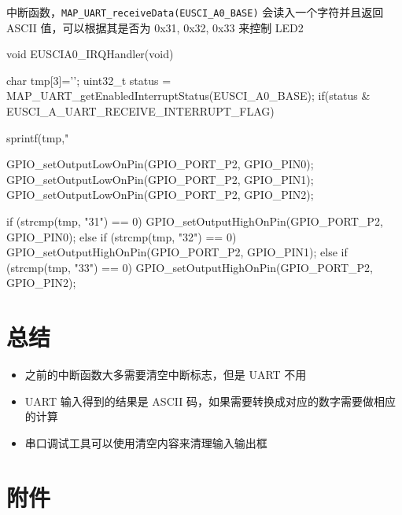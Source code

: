 \documentclass[a4paper,10pt,UTF8]{paper}
\numberwithin{equation}{section}
\numberwithin{figure}{section}
\begin{document}
中断函数，\texttt{MAP\_UART\_receiveData(EUSCI\_A0\_BASE)} 会读入一个字符并且返回 ASCII 值，可以根据其是否为 0x31, 0x32, 0x33 来控制 LED2

\begin{ccode}
  void EUSCIA0_IRQHandler(void)
  {
    char tmp[3]={'\0'};
    uint32_t status = MAP_UART_getEnabledInterruptStatus(EUSCI_A0_BASE);
    if(status & EUSCI_A_UART_RECEIVE_INTERRUPT_FLAG)
    {          
      sprintf(tmp,"%

      GPIO_setOutputLowOnPin(GPIO_PORT_P2, GPIO_PIN0);
      GPIO_setOutputLowOnPin(GPIO_PORT_P2, GPIO_PIN1);
      GPIO_setOutputLowOnPin(GPIO_PORT_P2, GPIO_PIN2);

      if (strcmp(tmp, "31") == 0) {
        GPIO_setOutputHighOnPin(GPIO_PORT_P2, GPIO_PIN0);
      } else if (strcmp(tmp, "32") == 0) {
        GPIO_setOutputHighOnPin(GPIO_PORT_P2, GPIO_PIN1);
      } else if (strcmp(tmp, "33") == 0) {
        GPIO_setOutputHighOnPin(GPIO_PORT_P2, GPIO_PIN2);
      }
    }   
  }
\end{ccode}

\section{总结}

\begin{itemize}
  \item 之前的中断函数大多需要清空中断标志，但是 UART 不用
  \item UART 输入得到的结果是 ASCII 码，如果需要转换成对应的数字需要做相应的计算
  \item 串口调试工具可以使用清空内容来清理输入输出框
\end{itemize}
  
\section{附件}
\end{document}
